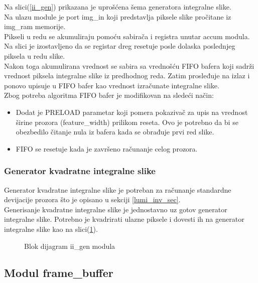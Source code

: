 Na slici(\ref{ii_gen}) prikazana je uprošćena šema generatora integralne slike.
\\

Na ulazu module je port img\_in koji predstavlja piksele slike pročitane iz
img\_ram memorije. \\

Pikseli u redu se akumuliraju pomoću sabirača i registra unutar accum modula.
Na slici je izostavljeno da se registar dreg resetuje posle dolaska poslednjeg
piksela u redu slike. \\

Nakon toga akumulirana vrednost se sabira sa vrednošću FIFO bafera koji sadrži
vrednost piksela integralne slike iz predhodnog reda.
Zatim prosleđuje na izlaz i ponovo upisuje u FIFO bafer kao vrednost izračunate
integralne slike.\\

\noindent
Zbog potreba algoritma FIFO bafer je modifikovan na sledeći način:
\begin{itemize}
  \item Dodat je PRELOAD parametar koji pomera pokazivač za upis na vrednost
    širine prozora (feature\_width) prilikom reseta. Ovo je potrebno da bi se
    obezbedilo čitanje nula iz bafera kada se obrađuje prvi red slike.
  \item FIFO se resetuje kada je završeno računanje celog prozora.
\end{itemize}

\subsubsection{Generator kvadratne integralne slike}\label{sii_gen_sec}

Generator kvadratne integralne slike je potreban za računanje standardne
devijacije prozora što je opisano u sekciji \ref{lumi_inv_sec}. \\
Generisanje kvadratne integralne slike je jednostavno uz gotov generator
integralne slike.
Potrebno je kvadrirati ulazne piksele i dovesti ih na generator integralne slike
kao na slici(\ref{sii_gen}).

\begin{figure}[H]
  \centering
  \scalebox{1.0}{
    
    }
\caption{Blok dijagram ii\_gen modula}
\label{sii_gen}
\end{figure}

\newpage

\subsection{Modul frame\_buffer}

